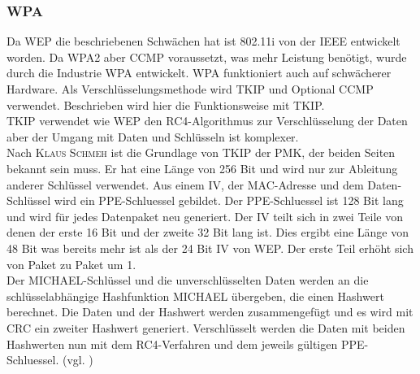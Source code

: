 \subsubsection{\ac{WPA}} 
Da \ac{WEP} die beschriebenen Schwächen hat ist 802.11i von der \ac{IEEE} entwickelt worden. Da \ac{WPA2} aber \ac{CCMP} voraussetzt, was mehr Leistung benötigt, wurde durch die Industrie \ac{WPA} entwickelt. \ac{WPA} funktioniert auch auf schwächerer Hardware. Als Verschlüsselungsmethode wird \ac{TKIP} und Optional \ac{CCMP} verwendet. Beschrieben wird hier die Funktionsweise mit \ac{TKIP}. \\
\ac{TKIP} verwendet wie \ac{WEP} den RC4-Algorithmus zur Verschlüsselung der Daten aber der Umgang mit Daten und Schlüsseln ist komplexer. \\
Nach \textsc{Klaus Schmeh} \cite{SWB-378541420} ist die Grundlage von \ac{TKIP} der \ac{PMK}, der beiden Seiten bekannt sein muss. Er hat eine Länge von 256 Bit und wird nur zur Ableitung anderer Schlüssel verwendet. Aus einem \ac{IV}, der MAC-Adresse und dem Daten-Schlüssel wird ein \ac{PPE-Schluessel} gebildet. Der \ac{PPE-Schluessel} ist 128 Bit lang und wird für jedes Datenpaket neu generiert.
Der \ac{IV} teilt sich in zwei Teile von denen der erste 16 Bit und der zweite 32 Bit lang ist. Dies ergibt eine Länge von 48 Bit was bereits mehr ist als der 24 Bit \ac{IV} von WEP. Der erste Teil erhöht sich von Paket zu Paket um 1.\\
Der MICHAEL-Schlüssel und die unverschlüsselten Daten werden an die schlüsselabhängige Hashfunktion MICHAEL übergeben, die einen Hashwert berechnet. Die Daten und der Hashwert werden zusammengefügt und es wird mit CRC ein zweiter Hashwert generiert. Verschlüsselt werden die Daten mit beiden Hashwerten nun mit dem RC4-Verfahren und dem jeweils gültigen \ac{PPE-Schluessel}. (vgl. \cite{SWB-378541420})


